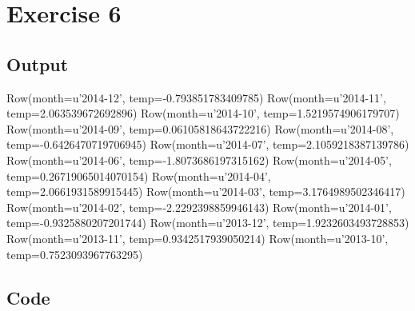 \documentclass[10pt]{article}
\begin{document}
\section*{Exercise 6}
\label{sec-6}
\subsection*{Output}
\label{sec-6-1}
Row(month=u'2014-12', temp=-0.793851783409785)
Row(month=u'2014-11', temp=2.063539672692896)
Row(month=u'2014-10', temp=1.5219574906179707)
Row(month=u'2014-09', temp=0.06105818643722216)
Row(month=u'2014-08', temp=-0.6426470719706945)
Row(month=u'2014-07', temp=2.1059218387139786)
Row(month=u'2014-06', temp=-1.8073686197315162)
Row(month=u'2014-05', temp=0.26719065014070154)
Row(month=u'2014-04', temp=2.0661931589915445)
Row(month=u'2014-03', temp=3.1764989502346417)
Row(month=u'2014-02', temp=-2.2292398859946143)
Row(month=u'2014-01', temp=-0.9325880207201744)
Row(month=u'2013-12', temp=1.9232603493728853)
Row(month=u'2013-11', temp=0.9342517939050214)
Row(month=u'2013-10', temp=0.7523093967763295)
\subsection*{Code}
\label{sec-6-2}
\end{document}

